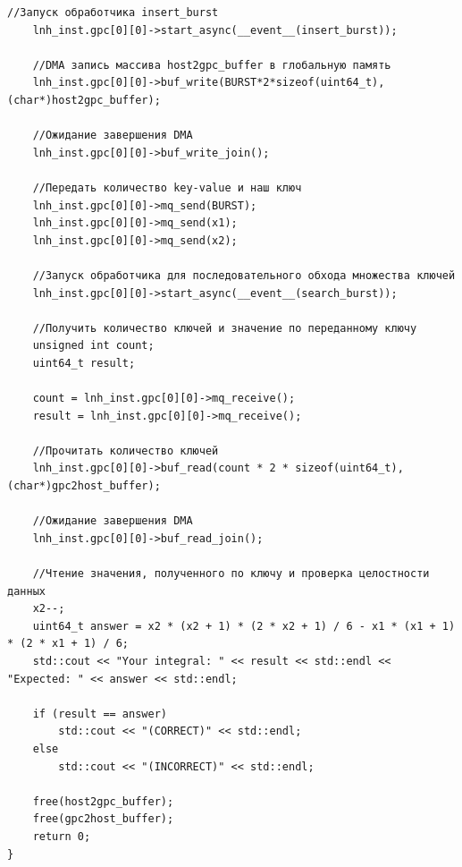 \begin{lstlisting}[label=code, caption=Код программы host\_main.cpp]
	//Запуск обработчика insert_burst
	lnh_inst.gpc[0][0]->start_async(__event__(insert_burst));

	//DMA запись массива host2gpc_buffer в глобальную память
	lnh_inst.gpc[0][0]->buf_write(BURST*2*sizeof(uint64_t),(char*)host2gpc_buffer);

	//Ожидание завершения DMA
	lnh_inst.gpc[0][0]->buf_write_join();

	//Передать количество key-value и наш ключ
	lnh_inst.gpc[0][0]->mq_send(BURST);
	lnh_inst.gpc[0][0]->mq_send(x1);
	lnh_inst.gpc[0][0]->mq_send(x2);

	//Запуск обработчика для последовательного обхода множества ключей
	lnh_inst.gpc[0][0]->start_async(__event__(search_burst));

	//Получить количество ключей и значение по переданному ключу
	unsigned int count;
	uint64_t result;

	count = lnh_inst.gpc[0][0]->mq_receive();
	result = lnh_inst.gpc[0][0]->mq_receive();

	//Прочитать количество ключей
	lnh_inst.gpc[0][0]->buf_read(count * 2 * sizeof(uint64_t), (char*)gpc2host_buffer);

	//Ожидание завершения DMA
	lnh_inst.gpc[0][0]->buf_read_join();

	//Чтение значения, полученного по ключу и проверка целостности данных
	x2--;
	uint64_t answer = x2 * (x2 + 1) * (2 * x2 + 1) / 6 - x1 * (x1 + 1) * (2 * x1 + 1) / 6;
	std::cout << "Your integral: " << result << std::endl << "Expected: " << answer << std::endl; 

	if (result == answer) 
		std::cout << "(CORRECT)" << std::endl;
	else
		std::cout << "(INCORRECT)" << std::endl;

	free(host2gpc_buffer);
	free(gpc2host_buffer);
	return 0;
}
\end{lstlisting}
\captionsetup{singlelinecheck = false, justification=centering}


\newpage

